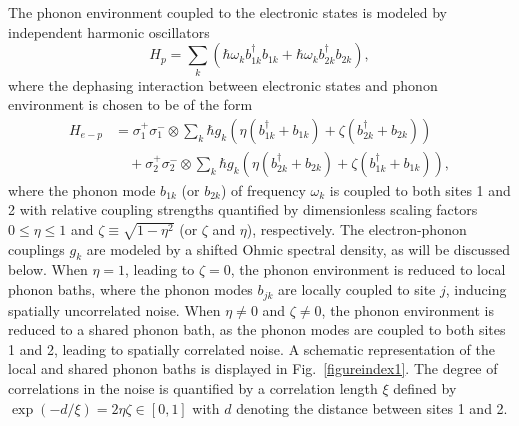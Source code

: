 \documentclass[%
 reprint,%
 amssymb, amsmath,%
 aip,cha,%
]{revtex4-1}
\begin{document}
The phonon environment coupled to the electronic states is modeled by independent harmonic oscillators
\begin{equation}
	H_p=\sum_{k}(\hbar\omega_{k}b_{1k}^{\dagger}b_{1k}+\hbar\omega_{k}b_{2k}^{\dagger}b_{2k}),
\end{equation}
where the dephasing interaction between electronic states and phonon environment is chosen to be of the form
\begin{align}
	H_{e-p}&=\sigma_{1}^{+}\sigma_{1}^{-}\otimes\sum_{k}\hbar g_{k}(\eta(b_{1k}^{\dagger}+b_{1k})+\zeta(b_{2k}^{\dagger}+b_{2k}))\nonumber\\
	&\quad+\sigma_{2}^{+}\sigma_{2}^{-}\otimes\sum_{k}\hbar g_{k}(\eta(b_{2k}^{\dagger}+b_{2k})+\zeta(b_{1k}^{\dagger}+b_{1k})),\label{eq:H_ep}
\end{align}
where the phonon mode $b_{1k}$ (or $b_{2k}$) of frequency $\omega_k$ is coupled to both sites 1 and 2 with relative coupling strengths quantified by dimensionless scaling factors $0\le\eta\le 1$ and $\zeta\equiv\sqrt{1-\eta^2}$ (or $\zeta$ and $\eta$), respectively. The electron-phonon couplings $g_k$ are modeled by a shifted Ohmic spectral density, as will be discussed below. When $\eta=1$, leading to $\zeta=0$, the phonon environment is reduced to local phonon baths, where the phonon modes $b_{jk}$ are locally coupled to site $j$, inducing spatially uncorrelated noise. When $\eta\neq 0$ and $\zeta\neq 0$, the phonon environment is reduced to a shared phonon bath, as the phonon modes are coupled to both sites 1 and 2, leading to spatially correlated noise. A schematic representation of the local and shared phonon baths is displayed in Fig.~\ref{figureindex1}.  The degree of correlations in the noise is quantified by a correlation length $\xi$ defined by $\exp(-d/\xi) = 2\eta\zeta \in \left[0,1\right]$ with $d$ denoting the distance between sites 1 and 2.
\end{document}
